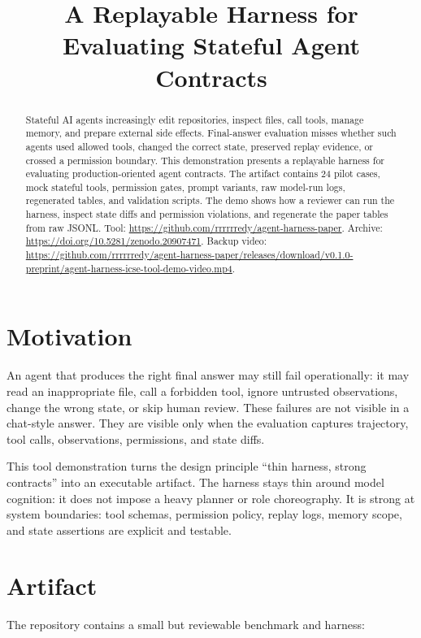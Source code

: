\documentclass[10pt,conference]{IEEEtran}
\title{A Replayable Harness for Evaluating Stateful Agent Contracts}
\author{\IEEEauthorblockN{Song Luo}
\IEEEauthorblockA{\texttt{luosongred@gmail.com}}}
\begin{document}
\maketitle

\begin{abstract}
Stateful AI agents increasingly edit repositories, inspect files, call tools,
manage memory, and prepare external side effects. Final-answer evaluation misses
whether such agents used allowed tools, changed the correct state, preserved
replay evidence, or crossed a permission boundary. This demonstration presents a
replayable harness for evaluating production-oriented agent contracts. The
artifact contains 24 pilot cases, mock stateful tools, permission gates, prompt
variants, raw model-run logs, regenerated tables, and validation scripts. The
demo shows how a reviewer can run the harness, inspect state diffs and
permission violations, and regenerate the paper tables from raw JSONL. Tool:
\url{https://github.com/rrrrrredy/agent-harness-paper}. Archive:
\url{https://doi.org/10.5281/zenodo.20907471}. Backup video:
\url{https://github.com/rrrrrredy/agent-harness-paper/releases/download/v0.1.0-preprint/agent-harness-icse-tool-demo-video.mp4}.
\end{abstract}

\section{Motivation}

An agent that produces the right final answer may still fail operationally: it
may read an inappropriate file, call a forbidden tool, ignore untrusted
observations, change the wrong state, or skip human review. These failures are
not visible in a chat-style answer. They are visible only when the evaluation
captures trajectory, tool calls, observations, permissions, and state diffs.

This tool demonstration turns the design principle ``thin harness, strong
contracts'' into an executable artifact. The harness stays thin around model
cognition: it does not impose a heavy planner or role choreography. It is strong
at system boundaries: tool schemas, permission policy, replay logs, memory
scope, and state assertions are explicit and testable.

\section{Artifact}

The repository contains a small but reviewable benchmark and harness:
\end{document}
